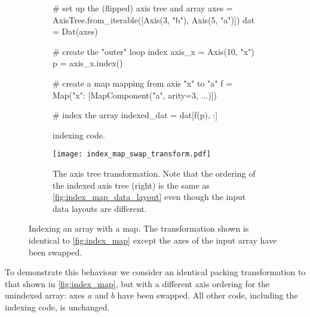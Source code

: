\documentclass[thesis]{subfiles}
\begin{document}
\begin{figure}
  \centering
  \begin{subfigure}{.9\textwidth}
    \begin{pyalg2}
      # set up the (flipped) axis tree and array
      axes = AxisTree.from_iterable([Axis(3, "b"), Axis(5, "a")])
      dat = Dat(axes)

      # create the "outer" loop index
      axis_x = Axis(10, "x")
      p = axis_x.index()

      # create a map mapping from axis "x" to "a"
      f = Map({"x": [MapComponent("a", arity=3, ...)]})

      # index the array
      indexed_dat = dat[f(p), :]
    \end{pyalg2}

    \caption{ indexing code.}
    \label{fig:index_map_swap_code}
  \end{subfigure}

  \vspace{1em}

  \begin{subfigure}{\textwidth}
    \centering
    \texttt{[image: index\_map\_swap\_transform.pdf]}
    \caption{
      The axis tree transformation.
      Note that the ordering of the indexed axis tree (right) is the same as \cref{fig:index_map_data_layout} even though the input data layouts are different.
    }
    \label{fig:index_map_swap_transform}
  \end{subfigure}

  \caption{
    Indexing an array with a map.
    The transformation shown is identical to \cref{fig:index_map} except the axes of the input array have been swapped.
  }
\end{figure}

To demonstrate this behaviour we consider an identical packing transformation to that shown in \cref{fig:index_map}, but with a different axis ordering for the unindexed array: axes $a$ and $b$ have been swapped.
All other code, including the indexing code, is unchanged.
\end{document}
